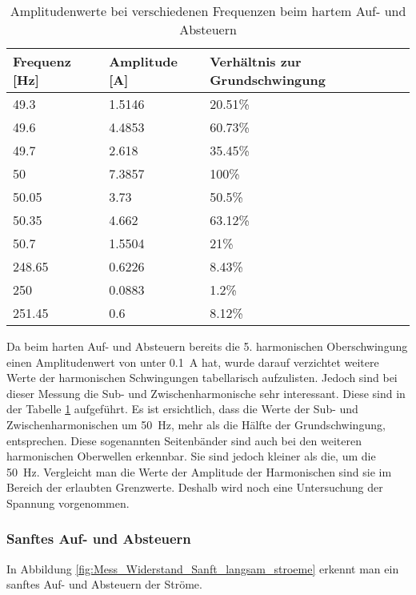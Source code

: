 \begin{table}[ht!]
	\centering
	\begin{tabular}{|l|l|l|}
		\hline
		Frequenz {[}Hz{]} & Amplitude {[}A{]} & Verhältnis zur Grundschwingung	\\ \hline
		49.3              & 1.5146            & 20.51\%							\\ \hline
		49.6              & 4.4853            & 60.73\%							\\ \hline
		49.7              & 2.618             & 35.45\%							\\ \hline
		50                & 7.3857            & 100\%							\\ \hline
		50.05             & 3.73              & 50.5\%							\\ \hline
		50.35             & 4.662             & 63.12\%							\\ \hline
		50.7              & 1.5504            & 21\%							\\ \hline
		248.65            & 0.6226            & 8.43\%							\\ \hline
		250               & 0.0883            & 1.2\%							\\ \hline
		251.45            & 0.6               & 8.12\%							\\ \hline
	\end{tabular}
	\caption{Amplitudenwerte bei verschiedenen Frequenzen beim hartem Auf- und Absteuern}\label{tab:Sanft_stroeme}
\end{table}
Da beim harten Auf- und Absteuern bereits die 5. harmonischen Oberschwingung einen Amplitudenwert von unter \SI{0.1}{A} hat, wurde darauf verzichtet weitere Werte der harmonischen Schwingungen tabellarisch aufzulisten. Jedoch sind bei dieser Messung die Sub- und Zwischenharmonische sehr interessant. Diese sind in der Tabelle \ref{tab:Sanft_stroeme} aufgeführt. Es ist ersichtlich, dass die Werte der Sub- und Zwischenharmonischen um \SI{50}{Hz}, mehr als die Hälfte der Grundschwingung, entsprechen. Diese sogenannten Seitenbänder sind auch bei den weiteren harmonischen Oberwellen erkennbar. Sie sind jedoch kleiner als die, um die \SI{50}{Hz}. Vergleicht man die Werte der Amplitude der Harmonischen sind sie im Bereich der erlaubten Grenzwerte. Deshalb wird noch eine Untersuchung der Spannung vorgenommen.


\newpage
\subsubsection*{Sanftes Auf- und Absteuern}\label{sec:Sanft_Widerstand_stroeme}
In Abbildung \ref{fig:Mess_Widerstand_Sanft_langsam_stroeme} erkennt man ein sanftes Auf- und Absteuern der Ströme.

